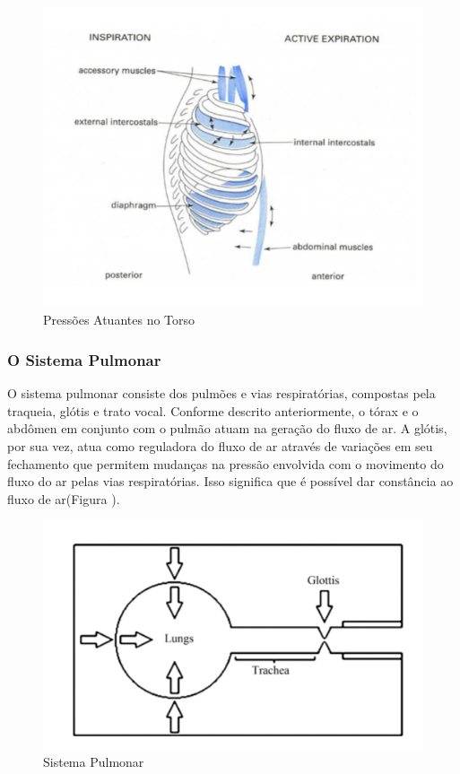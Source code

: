 		\begin{figure}
			\includegraphics{esquemaRespiracao}
			\caption{ Pressões Atuantes no Torso~\cite{IngoTitze}}
			\label{fig:esquemaRespiracao}
		\end{figure}
	
	\subsubsection{O Sistema Pulmonar}
	
	O sistema pulmonar consiste dos pulmões e vias respiratórias, compostas pela traqueia, glótis e trato vocal. Conforme descrito anteriormente, o tórax e o abdômen em conjunto com o pulmão atuam na geração do ﬂuxo de ar. A glótis, por sua vez, atua como reguladora do ﬂuxo de ar através de variações em seu fechamento que permitem mudanças na pressão envolvida com o movimento do ﬂuxo do ar pelas vias respiratórias. Isso signiﬁca que é possível dar constância ao ﬂuxo de ar(Figura ).
	
	\begin{figure}
		\includegraphics{esquemaPulmao}
		\caption{ Sistema Pulmonar}
		\label{fig:esquemaPulmao}
	\end{figure}
	
